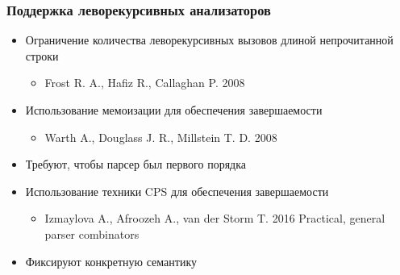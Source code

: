 \documentclass{beamer}
\begin{document}
\begin{frame}[fragile]
  \transwipe[direction=90]
  \frametitle{Поддержка леворекурсивных анализаторов}
  \begin{itemize} %
    \item Ограничение количества леворекурсивных вызовов длиной непрочитанной строки
    \begin{itemize}
      \item Frost R. A., Hafiz R., Callaghan P. 2008 %
    \end{itemize}
    \item Использование мемоизации для обеспечения завершаемости
    \begin{itemize}
      \item Warth A., Douglass J. R., Millstein T. D. 2008 %
    \end{itemize}

    \item Требуют, чтобы парсер был первого порядка
  \end{itemize}

  \begin{itemize}
    \item Использование техники CPS для обеспечения завершаемости
    \begin{itemize}
      \item Izmaylova	A., Afroozeh A., van der Storm T. 2016 %
Practical, general parser combinators
    \end{itemize}

    \item Фиксируют конкретную семантику
  \end{itemize}  

\end{frame}

\end{document}
